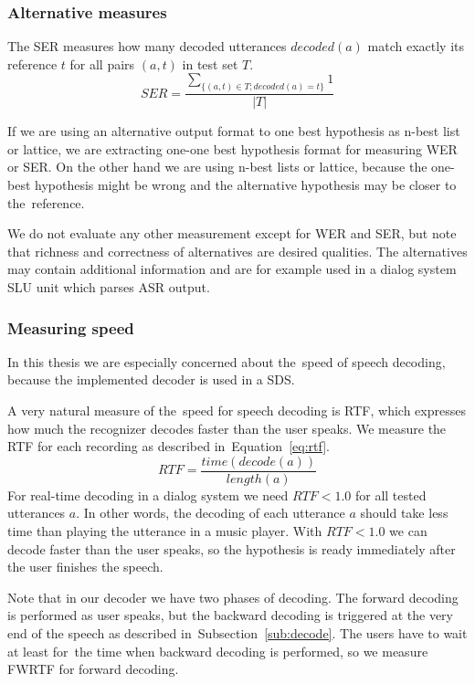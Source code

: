 {\subsubsection*{Alternative measures}
The \acl{SER} measures how many decoded utterances $decoded(a)$ match exactly its reference $t$
for all pairs $(a, t)$ in test set $T$.
\begin{equation}
    SER = \frac{\sum_{\{(a, t) \in T; decoded(a) = t\}}{1}}{|T|}
\end{equation}

If we are using an alternative output format to one best hypothesis as n-best list or lattice,
we are extracting one-one best hypothesis format for measuring \ac{WER} or \ac{SER}.
On the other hand we are using n-best lists or lattice,
because the one-best hypothesis might be wrong and the alternative
hypothesis may be closer to the~reference.

We do not evaluate any other measurement except for \ac{WER} and \ac{SER},
but note that richness and correctness of alternatives are desired qualities.
The alternatives may contain additional information and are for example used
in a dialog system \acl{SLU} unit which parses \ac{ASR} output.

\subsubsection*{Measuring speed}
\label{sub:the_metrics_in_speech_recognition}
In this thesis we are especially concerned about the~speed of speech decoding,
because the implemented decoder is used in a \acl{SDS}.

A very natural measure of the~speed for speech decoding is \acl{RTF},
which expresses how much the recognizer decodes faster than the user speaks.
We measure the \ac{RTF} for each recording as described in~Equation~\ref{eq:rtf}.
\begin{equation}\label{eq:rtf}
    RTF = \frac{time(decode(a))}{length(a)}
\end{equation}
For real-time decoding in a dialog system we need $RTF < 1.0$ for all tested utterances $a$.
In other words, the decoding of each utterance $a$ should take less time than
playing the utterance in a music player.
With $RTF < 1.0$ we can decode faster than the user speaks, 
so the hypothesis is ready immediately after the user finishes the speech. 

Note that in our decoder we have two phases of decoding.
The forward decoding is performed as user speaks, but
the backward decoding is triggered at the very end of the speech
as described in~Subsection~\ref{sub:decode}.
The users have to wait at least for~the time when backward decoding is performed,
so we measure \ac{FWRTF} for forward decoding.

}

